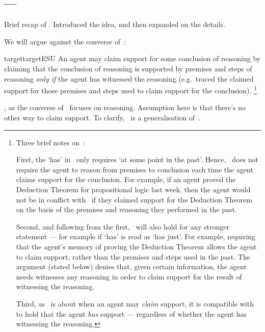 \subsection{\ESU{} --- \ESU{-}}
\label{sec:esu}

\begin{note}
  Brief recap of \USE{}.
  Introduced the idea, and then expanded on the details.
\end{note}

\begin{note}[Focus]
  We will argue against the converse of~\USE{}:

  \begin{restatable}[\ESU{-} --- \ESU{}]{target}{targetESU}\label{denied-claim}
    An agent may claim support for some conclusion of reasoning by claiming that the conclusion of reasoning is supported by premises and steps of reasoning \emph{only if} the agent has witnessed the reasoning (e.g.\ traced the claimed support for those premises and steps used to claim support for the conclusion).\nolinebreak
    \footnote{
      Three brief notes on~\ESU{}:

      First, the `has' in~\ESU{} only requires `at some point in the past'.
      Hence,~\ESU{} does not require the agent to reason from premises to conclusion each time the agent claims support for the conclusion.
      For example, if an agent proved the Deduction Theorem for propositional logic last week, then the agent would not be in conflict with~\ESU{} if they claimed support for the Deduction Theorem on the basis of the premises and reasoning they performed in the past.

      Second, and following from the first,~\ESU{} will also hold for any stronger statement --- for example if `has' is read as `has just'.
      For example, requiring that the agent's memory of proving the Deduction Theorem allows the agent to claim support, rather than the premises and steps used in the past.
      The argument (stated below) denies that, given certain information, the agent needs witnesses any reasoning in order to claim support for the result of witnessing the reasoning.

      Third, as~\ESU{} is about when an agent may \emph{claim} support, it is compatible with~\ESU{} to hold that the agent \emph{has} support --- regardless of whether the agent has witnessing the reasoning.
    }
  \end{restatable}

  \ESU{}, as the converse of~\USE{} focuses on reasoning.
  {
    \color{red}
    Assumption here is that there's no other way to claim support.
  }
  To clarify,~\gESU{} is a generalisation of~\ESU{}.



\end{note}
